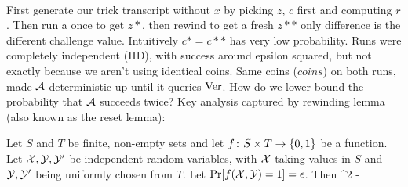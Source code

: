 \\

First generate our trick transcript without $x$ by picking $z$, $c$ first and computing $r$. Then run a once to get $z*$, then rewind to get a fresh $z**$ only difference is the different challenge value. Intuitively $c*=c**$ has very low probability. Runs were completely independent (IID), with success around epsilon squared, but not exactly because we aren't using identical coins. Same coins ($coins$) on both runs, made ${\mathcal A}$ deterministic up until it queries $\textnormal{Ver}$. How do we lower bound the probability that ${\mathcal A}$ succeeds twice? Key analysis captured by rewinding lemma (also known as the reset lemma):


\begin{lemma*}
\label{lem:rewind}
Let $S$ and $T$ be finite, non-empty sets and let $f{{\kern .05em}\colon{\kern .05em}} S\times T\rightarrow
\{0,1\}$ be a function. Let ${\cal X},{\cal Y},{\cal Y}'$ be independent random variables,
with ${\cal X}$ taking values in $S$ and ${\cal Y},{\cal Y}'$ being uniformly chosen from
$T$. Let $\Pr[f({\cal X},{\cal Y}) = 1] = \epsilon$. Then 
\bnm
      \ge \epsilon^2 - 
\enm
\end{lemma*}

